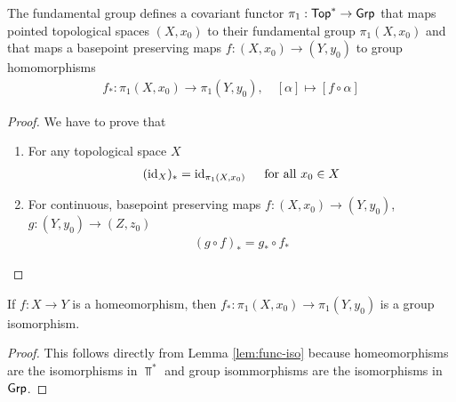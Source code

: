 \begin{lem}[]
  The fundamental group defines a covariant functor $\pi_1: \text{\sffamily Top}^{\ast} \to \text{\sffamily Grp}$ that maps pointed topological spaces $(X,x_0)$ to their fundamental group $\pi_1(X,x_0)$ and that maps a basepoint preserving maps $f: (X,x_0) \to (Y,y_0)$ to group homomorphisms
\begin{align*}
  f_{\ast}: \pi_1(X,x_0) \to \pi_1(Y,y_0)
  , \quad
  [\alpha] \mapsto [f \circ \alpha]
\end{align*}
\end{lem}
\begin{proof}
We have to prove that 
\begin{enumerate}
  \item For any topological space $X$
    \begin{align*}
      (\operatorname{id}_X)_{\ast} = \operatorname{id}_{\pi_1(X,x_0)} \quad \text{ for all } x_0 \in X
    \end{align*}
  \item For continuous, basepoint preserving maps $f: (X,x_0) \to (Y,y_0)$, $g:(Y,y_0) \to (Z,z_0)$
    \begin{align*}
      (g \circ f)_{\ast} = g_{\ast} \circ f_{\ast}
    \end{align*}
\end{enumerate}
\end{proof}

\begin{cor}[]
  If $f: X \to  Y$ is a homeomorphism, then $f_{\ast}: \pi_1(X,x_0) \to  \pi_1(Y,y_0)$ is a group isomorphism.
\end{cor}
\begin{proof}
  This follows directly from Lemma \ref{lem:func-iso} because homeomorphisms are the isomorphisms in $\Top^{\ast}$ and group isommorphisms are the isomorphisms in $\text{\sffamily Grp}$.
\end{proof}


